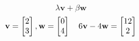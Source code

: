 \documentclass[12 pt]{slides}
\begin{document}
\begingroup
\[\lambda\textbf{v} + \beta\textbf{w}\]
\endgroup
\[\\ \textbf{v} = \begin{bmatrix}2\\3\end{bmatrix}, \textbf{w} = \begin{bmatrix}0\\4\end{bmatrix}\quad 6\textbf{v} - 4\textbf{w} = \begin{bmatrix}12\\2\end{bmatrix}\]
\end{document}
